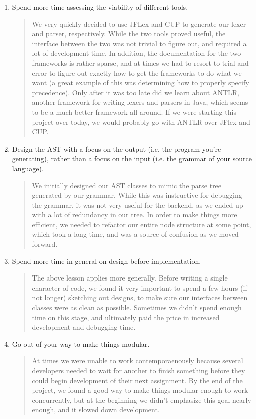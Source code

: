 \documentclass{book}
\begin{document}
\begin{enumerate}
\item Spend more time assessing the viability of different tools.
\begin{quotation}
\noindent We very quickly decided to use JFLex and CUP to generate our lexer and parser, respectively. While the two tools proved useful, the interface between the two was not trivial to
figure out, and required a lot of development time. In addition, the documentation for the two
frameworks is rather sparse, and at times we had to resort to trial-and-error to figure out
exactly how to get the frameworks to do what we want (a great example of this was determining
how to properly specify precedence). Only after it was too late did we learn about ANTLR, another framework for writing lexers and parsers in Java, which seems to be a much better framework all around. If we were starting this project over today, we would probably go with ANTLR over JFlex and CUP.  
\end{quotation}
\item Design the AST with a focus on the output (i.e. the program you're generating), rather than a focus on the input (i.e. the grammar of your source language).
\begin{quotation}
\noindent We initially designed our AST classes to mimic the parse tree generated by our
grammar. While this was instructive for debugging the grammar, it was not very useful for the backend, as we ended up with a lot of redundancy in our tree. In order to make things more efficient, we needed to refactor our entire node structure at some point, which took a long time, and was a source of confusion as we moved forward. 
\end{quotation}
\item Spend more time in general on design before implementation.
\begin{quotation}
\noindent The above lesson applies more generally. Before writing a single character of code,
we found it very important to spend a few hours (if not longer) sketching out designs, to make sure our interfaces between classes were as clean as possible. Sometimes we didn't spend enough time on this stage, and ultimately paid the price in increased development and debugging time. 
\end{quotation}
\item Go out of your way to make things modular.
\begin{quotation}
\noindent At times we were unable to work contemporaenously because several developers needed to wait for another to finish something before they could begin development of their next assignment. By the end of the project, we found a good way to make things modular enough to work concurrently, but at the beginning we didn't emphasize this goal nearly enough, and it slowed down development. 

\end{quotation}
\end{enumerate}
\end{document}
